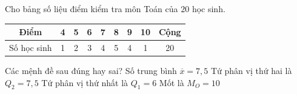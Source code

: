 \begin{ex}%
Cho bảng số liệu điểm kiểm tra môn Toán của $20$ học sinh.
\begin{center}
\begin{tabular}{|c|c|c|c|c|c|c|c|c|}
\hline Điểm & 4 & 5 & 6 & 7 & 8 & 9 & 10 & Cộng \\
\hline Số học sinh & 1 & 2 & 3 & 4 & 5 & 4 & 1 & 20 \\
\hline
\end{tabular}
\end{center}
Các mệnh đề sau đúng hay sai?
\choiceTF
{Số trung bình $\overline{x}=7{,}5$}
{\True Tứ phân vị thứ hai là $Q_2=7{,}5$}
{\True Tứ phân vị thứ nhất là $Q_1=6$}
{Mốt là $M_O=10$}
\end{ex}

